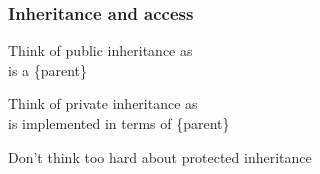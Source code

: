 \documentclass[14pt,a4paper,dvipsnames,usenames]{beamer}
\begin{document}
\begin{frame}[fragile]
  \frametitle{Inheritance and access}

  Think of {\color{FeebleWeek}public} inheritance as\\[5pt]
   is a {\color{Tropiteal}\{parent\}}

  \vspace{1cm}
  Think of {\color{Marty}private} inheritance as\\[5pt]
   is implemented in terms of {\color{Tropiteal}\{parent\}}

  \vspace{1cm}
  Don't think too hard about {\color{Marty}protected} inheritance

\end{frame}
\end{document}

